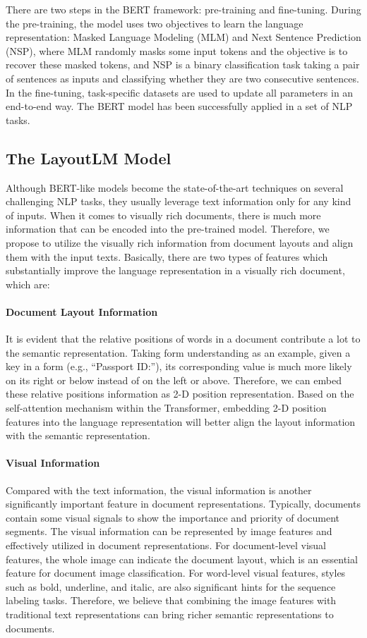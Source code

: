 \documentclass[sigconf]{acmart}
\begin{document}
There are two steps in the BERT framework: pre-training and fine-tuning. During the pre-training, the model uses two objectives to learn the language representation: Masked Language Modeling (MLM) and Next Sentence Prediction (NSP), where MLM randomly masks some input tokens and the objective is to recover these masked tokens, and NSP is a binary classification task taking a pair of sentences as inputs and classifying whether they are two consecutive sentences. In the fine-tuning, task-specific datasets are used to update all parameters in an end-to-end way. The BERT model has been successfully applied in a set of NLP tasks.

\subsection{The LayoutLM Model}

Although BERT-like models become the state-of-the-art techniques on several challenging NLP tasks, they usually leverage text information only for any kind of inputs. When it comes to visually rich documents, there is much more information that can be encoded into the pre-trained model. Therefore, we propose to utilize the visually rich information from document layouts and align them with the input texts. Basically, there are two types of features which substantially improve the language representation in a visually rich document, which are:

\paragraph{Document Layout Information}
It is evident that the relative positions of words in a document contribute a lot to the semantic representation. Taking form understanding as an example, given a key in a form (e.g., ``Passport ID:''), its corresponding value is much more likely on its right or below instead of on the left or above. Therefore, we can embed these relative positions information as 2-D position representation. Based on the self-attention mechanism within the Transformer, embedding 2-D position features into the language representation will better align the layout information with the semantic representation.



\paragraph{Visual Information}
Compared with the text information, the visual information is another significantly important feature in document representations. Typically, documents contain some visual signals to show the importance and priority of document segments. The visual information can be represented by image features and effectively utilized in document representations. For document-level visual features, the whole image can indicate the document layout, which is an essential feature for document image classification. For word-level visual features, styles such as bold, underline, and italic, are also significant hints for the sequence labeling tasks. Therefore, we believe that combining the image features with traditional text representations can bring richer semantic representations to documents.
\end{document}
